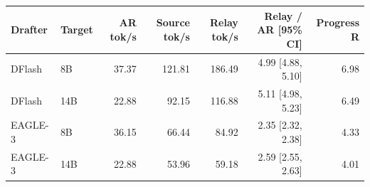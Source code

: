 \begin{tabular}{llrrrrr}
\toprule
Drafter & Target & AR tok/s & Source tok/s & Relay tok/s & Relay / AR [95\% CI] & Progress R \\
\midrule
DFlash & 8B & 37.37 & 121.81 & 186.49 & 4.99 [4.88, 5.10] & 6.98 \\
DFlash & 14B & 22.88 & 92.15 & 116.88 & 5.11 [4.98, 5.23] & 6.49 \\
EAGLE-3 & 8B & 36.15 & 66.44 & 84.92 & 2.35 [2.32, 2.38] & 4.33 \\
EAGLE-3 & 14B & 22.88 & 53.96 & 59.18 & 2.59 [2.55, 2.63] & 4.01 \\
\bottomrule
\end{tabular}
